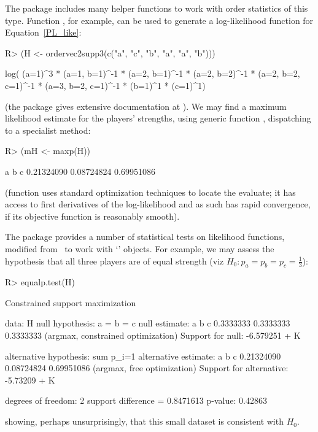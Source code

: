 \documentclass[article]{jss}
\begin{document}
The package includes many helper functions to work with order
statistics of this type.  Function , for
example, can be used to generate a log-likelihood function for
Equation~\ref{PL_like}:
%
\begin{Schunk}
\begin{Sinput}
R> (H <- ordervec2supp3(c("a", "c", "b", "a", "a", "b")))
\end{Sinput}
\begin{Soutput}
log( (a=1)^3 * (a=1, b=1)^-1 * (a=2, b=1)^-1 * (a=2, b=2)^-1 * (a=2,
b=2, c=1)^-1 * (a=3, b=2, c=1)^-1 * (b=1)^1 * (c=1)^1)
\end{Soutput}
\end{Schunk}
%
(the package gives extensive documentation at
).  We may find a maximum likelihood estimate
for the players' strengths, using generic function ,
dispatching to a specialist  method:
%
\begin{Schunk}
\begin{Sinput}
R> (mH <- maxp(H))
\end{Sinput}
\begin{Soutput}
         a          b          c 
0.21324090 0.08724824 0.69951086 
\end{Soutput}
\end{Schunk}
%
(function  uses standard optimization techniques to
locate the evaluate; it has access to first derivatives of the
log-likelihood and as such has rapid convergence, if its objective
function is reasonably smooth).

The package provides a number of statistical tests on likelihood
functions, modified from~\citet{hankin2017} to work with `'
objects.  For example, we may assess the hypothesis that all three
players are of equal strength (viz $H_0\colon
p_a=p_b=p_c=\frac{1}{3}$):
%
\begin{Schunk}
\begin{Sinput}
R> equalp.test(H)
\end{Sinput}
\begin{Soutput}
	Constrained support maximization

data:  H
null hypothesis: a = b = c
null estimate:
        a         b         c 
0.3333333 0.3333333 0.3333333 
(argmax, constrained optimization)
Support for null:  -6.579251 + K

alternative hypothesis:  sum p_i=1 
alternative estimate:
         a          b          c 
0.21324090 0.08724824 0.69951086 
(argmax, free optimization)
Support for alternative:  -5.73209 + K

degrees of freedom: 2
support difference = 0.8471613
p-value: 0.42863 
\end{Soutput}
\end{Schunk}
%
showing, perhaps unsurprisingly, that this small dataset is consistent
with $H_0$. 
\end{document}
